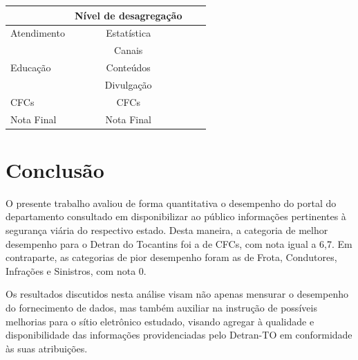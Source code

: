 \documentclass[
  a4paper,
]{article}
\begin{document}
\begin{longtable}{l|ccc}
 & Nível de desagregação & \cellcolor[HTML]{D7191C}{\textcolor[HTML]{FFFFFF}{$0,0$}} & \cellcolor[HTML]{D7191C}{\textcolor[HTML]{FFFFFF}{$0,0$}} \\ 
\midrule\addlinespace[2.5pt]
Atendimento & Estatística & \cellcolor[HTML]{D7191C}{\textcolor[HTML]{FFFFFF}{$0,0$}} & \cellcolor[HTML]{D7191C}{\textcolor[HTML]{FFFFFF}{$0,0$}} \\ 
 & Canais & \cellcolor[HTML]{1FA149}{\textcolor[HTML]{FFFFFF}{$10,0$}} & \cellcolor[HTML]{1FA149}{\textcolor[HTML]{FFFFFF}{$10,0$}} \\ 
\midrule\addlinespace[2.5pt]
Educação & Conteúdos & \cellcolor[HTML]{D7191C}{\textcolor[HTML]{FFFFFF}{$0,0$}} & \cellcolor[HTML]{F05E22}{\textcolor[HTML]{FFFFFF}{$3,3$}} \\ 
 & Divulgação & \cellcolor[HTML]{D7191C}{\textcolor[HTML]{FFFFFF}{$0,0$}} & \cellcolor[HTML]{F5951E}{\textcolor[HTML]{000000}{$6,7$}} \\ 
\midrule\addlinespace[2.5pt]
CFCs & CFCs & \cellcolor[HTML]{1FA149}{\textcolor[HTML]{FFFFFF}{$10,0$}} & \cellcolor[HTML]{F5951E}{\textcolor[HTML]{000000}{$6,7$}} \\ 
\midrule\addlinespace[2.5pt]
Nota Final & Nota Final & \cellcolor[HTML]{ED5921}{\textcolor[HTML]{FFFFFF}{$2,9$}} & \cellcolor[HTML]{E94F20}{\textcolor[HTML]{FFFFFF}{$2,4$}} \\ 
\bottomrule

\end{longtable}

\section{Conclusão}\label{conclusuxe3o}

O presente trabalho avaliou de forma quantitativa o desempenho do portal
do departamento consultado em disponibilizar ao público informações
pertinentes à segurança viária do respectivo estado. Desta maneira, a
categoria de melhor desempenho para o Detran do Tocantins foi a de CFCs,
com nota igual a 6,7. Em contraparte, as categorias de pior desempenho
foram as de Frota, Condutores, Infrações e Sinistros, com nota 0.

Os resultados discutidos nesta análise visam não apenas mensurar o
desempenho do fornecimento de dados, mas também auxiliar na instrução de
possíveis melhorias para o sítio eletrônico estudado, visando agregar à
qualidade e disponibilidade das informações providenciadas pelo
Detran-TO em conformidade às suas atribuições.
\end{document}
